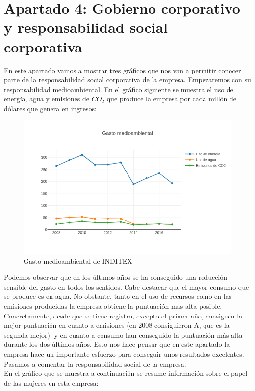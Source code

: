 \documentclass[11pt]{article}
\theoremstyle{plain}
\theoremstyle{definition}
\begin{document}
\section*{Apartado 4: Gobierno corporativo y responsabilidad social
  corporativa}

En este apartado vamos a mostrar tres gráficos que nos van a permitir
conocer parte de la responsabilidad social corporativa de la
empresa. Empezaremos con su responsabilidad medioambiental. En el
gráfico siguiente se muestra el uso de energía, agua y emisiones de
$CO_2$ que produce la empresa por cada millón de dólares que genera en
ingresos:

\begin{figure}[H]
  \centering
  \includegraphics[width=\textwidth]{graphs/environment.png}
  \caption{Gasto medioambiental de INDITEX}
\end{figure}

Podemos observar que en los últimos años se ha conseguido una
reducción sensible del gasto en todos los sentidos. Cabe destacar que
el mayor consumo que se produce es en agua. No obstante, tanto en el
uso de recursos como en las emisiones producidas la empresa obtiene la
puntuación más alta posible. Concretamente, desde que se tiene
registro, excepto el primer año, consiguen la mejor puntuación en
cuanto a emisiones (en 2008 consiguieron A, que es la segunda mejor),
y en cuanto a consumo han conseguido la puntuación más alta durante
los dos últimos años. Esto nos hace pensar que en este apartado la
empresa hace un importante esfuerzo para conseguir unos resultados
excelentes. Pasamos a comentar la responsabilidad social de la empresa.\\

En el gráfico que se muestra a continuación se resume información
sobre el papel de las mujeres en esta empresa:
\end{document}
